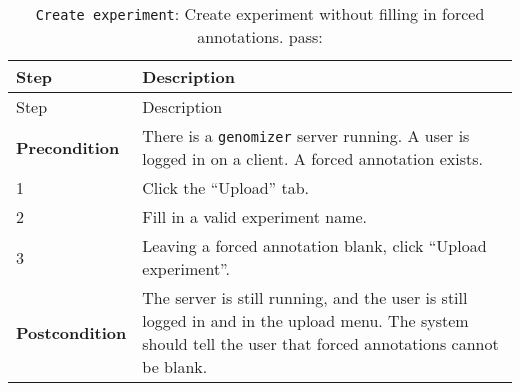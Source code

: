 \begin{longtable}[c]{@{}ll@{}}
\caption{\texttt{Create\ experiment}: Create experiment without filling
in forced annotations. pass:}\tabularnewline
\toprule
\begin{minipage}[b]{0.31\columnwidth}\raggedright\strut
Step
\strut\end{minipage} &
\begin{minipage}[b]{0.63\columnwidth}\raggedright\strut
Description
\strut\end{minipage}\tabularnewline
\midrule
\endfirsthead
\toprule
\begin{minipage}[b]{0.31\columnwidth}\raggedright\strut
Step
\strut\end{minipage} &
\begin{minipage}[b]{0.63\columnwidth}\raggedright\strut
Description
\strut\end{minipage}\tabularnewline
\midrule
\endhead
\begin{minipage}[t]{0.31\columnwidth}\raggedright\strut
\textbf{Precondition}
\strut\end{minipage} &
\begin{minipage}[t]{0.63\columnwidth}\raggedright\strut
There is a \texttt{genomizer} server running. A user is logged in on a
client. A forced annotation exists.
\strut\end{minipage}\tabularnewline
\begin{minipage}[t]{0.31\columnwidth}\raggedright\strut
1
\strut\end{minipage} &
\begin{minipage}[t]{0.63\columnwidth}\raggedright\strut
Click the ``Upload'' tab.
\strut\end{minipage}\tabularnewline
\begin{minipage}[t]{0.31\columnwidth}\raggedright\strut
2
\strut\end{minipage} &
\begin{minipage}[t]{0.63\columnwidth}\raggedright\strut
Fill in a valid experiment name.
\strut\end{minipage}\tabularnewline
\begin{minipage}[t]{0.31\columnwidth}\raggedright\strut
3
\strut\end{minipage} &
\begin{minipage}[t]{0.63\columnwidth}\raggedright\strut
Leaving a forced annotation blank, click ``Upload experiment''.
\strut\end{minipage}\tabularnewline
\begin{minipage}[t]{0.31\columnwidth}\raggedright\strut
\textbf{Postcondition}
\strut\end{minipage} &
\begin{minipage}[t]{0.63\columnwidth}\raggedright\strut
The server is still running, and the user is still logged in and in the
upload menu. The system should tell the user that forced annotations
cannot be blank.
\strut\end{minipage}\tabularnewline
\bottomrule
\end{longtable}

